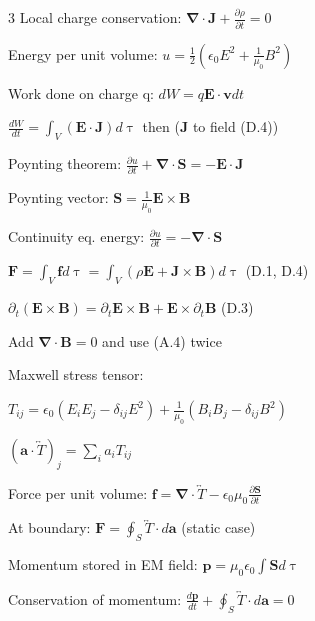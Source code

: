 \documentclass[a4paper,twoside]{article}
\begin{document}
\begin{multicols*}{3}
Local charge conservation:
\(\bm \nabla \cdot \bm J + \frac{\partial \rho}{\partial t} = 0\)


Energy per unit volume:
\(u = \frac{1}{2} (\epsilon_0 E^2 + \frac{1}{\mu_0} B^2)\)

Work done on charge q:
\(dW = q \bm E \cdot \bm v dt\)

\(\frac{dW}{dt} = \int_{V} (\bm E \cdot \bm J) d\uptau\) then (\(\bm J \) to field (D.4))

Poynting theorem:
\(\frac{\partial u}{\partial t} + \bm \nabla \cdot \bm S = -\bm E \cdot \bm J\)

Poynting vector:
\(\bm S = \frac{1}{\mu_0} \bm E \times \bm B\)

Continuity eq. energy:
\(\frac{\partial u}{\partial t} = -\bm \nabla \cdot \bm S \)


\(\bm F = \int_V \bm f d\uptau = \int_V (\rho \bm E + \bm J \times \bm B) d\uptau \) (D.1, D.4)

\(
\partial_t (\bm E \times \bm B) = \partial_t\bm E \times \bm B + \bm E \times \partial_t \bm B
\) (D.3)

Add \(\bm \nabla \cdot \bm B=0\) and use (A.4) twice


Maxwell stress tensor:

\(T_{ij} = \epsilon_0 (E_iE_j-\delta_{ij}E^2) +\frac{1}{\mu_0} (B_iB_j-\delta_{ij}B^2)\)

\((\bm a \cdot \overleftrightarrow{T})_j = \sum_i a_i T_{ij}\)

Force per unit volume:
\(\bm f = \bm\nabla \cdot \overleftrightarrow{T} - \epsilon_0 \mu_0 \frac{\partial \bm S}{\partial t}\)



At boundary:
\(\bm F = \oint _S \overleftrightarrow{T} \cdot d\bm a\) (static case)


Momentum stored in EM field:
\(\bm p = \mu_0 \epsilon_0 \int \bm S d\uptau  \)

Conservation of momentum:
\(\frac{d\bm p}{dt} + \oint_S \overleftrightarrow{T} \cdot d\bm a = 0\)


\end{multicols*}
\end{document}
